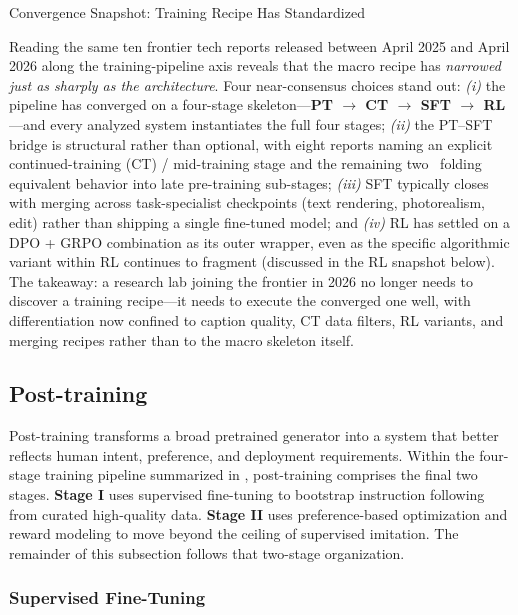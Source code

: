 \begin{highlightbox}{Convergence Snapshot: Training Recipe Has Standardized}

Reading the same ten frontier tech reports released between April 2025 and April 2026 along the training-pipeline axis reveals that the macro recipe has \emph{narrowed just as sharply as the architecture}. Four near-consensus choices stand out: \emph{(i)} the pipeline has converged on a four-stage skeleton---\textbf{PT $\to$ CT $\to$ SFT $\to$ RL}---and every analyzed system instantiates the full four stages; \emph{(ii)} the PT--SFT bridge is structural rather than optional, with eight reports naming an explicit continued-training (CT) / mid-training stage and the remaining two~\citep{wu2025qwen,cao2025hunyuanimage} folding equivalent behavior into late pre-training sub-stages; \emph{(iii)} SFT typically closes with merging across task-specialist checkpoints (text rendering, photorealism, edit) rather than shipping a single fine-tuned model; and \emph{(iv)} RL has settled on a DPO + GRPO combination as its outer wrapper, even as the specific algorithmic variant within RL continues to fragment (discussed in the RL snapshot below). The takeaway: a research lab joining the frontier in 2026 no longer needs to discover a training recipe---it needs to execute the converged one well, with differentiation now confined to caption quality, CT data filters, RL variants, and merging recipes rather than to the macro skeleton itself.
\end{highlightbox}


\subsection{Post-training}
\label{subsec:post_training}

Post-training transforms a broad pretrained generator into a system that better reflects human intent, preference, and deployment requirements. Within the four-stage training pipeline summarized in , post-training comprises the final two stages. \textbf{Stage I} uses supervised fine-tuning to bootstrap instruction following from curated high-quality data. \textbf{Stage II} uses preference-based optimization and reward modeling to move beyond the ceiling of supervised imitation. The remainder of this subsection follows that two-stage organization.

\subsubsection{Supervised Fine-Tuning}
\label{subsec:sft}

